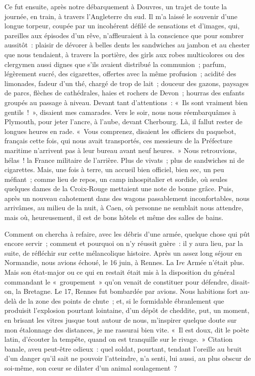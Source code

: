 \documentclass[french,twoside]{book} %
\begin{document}
Ce fut ensuite, après notre débarquement à Douvres, un trajet de toute la journée, en train, à travers l’Angleterre du sud. Il m’a laissé le souvenir d’une longue torpeur, coupée par un incohérent défilé de sensations et d’images, qui, pareilles aux épisodes d’un rêve, n’affleuraient à la conscience que pour sombrer aussitôt : plaisir de dévorer à belles dents les sandwiches au jambon et au chester que nous tendaient, à travers la portière, des girls aux robes multicolores ou des clergymen aussi dignes que s’ils avaient distribué la communion ; parfum, légèrement sucré, des cigarettes, offertes avec la même profusion ; acidité des limonades, fadeur d’un thé, chargé de trop de lait ; douceur des gazons, paysages de   parcs, flèches de cathédrales, haies et rochers de Devon ; hourras des enfants groupés au passage à niveau. Devant tant d’attentions : « Ils sont vraiment bien gentils ! », disaient mes camarades. Vers le soir, nous nous réembarquâmes à Plymouth, pour jeter l’ancre, à l’aube, devant Cherbourg. Là, il fallut rester de longues heures en rade. « Vous comprenez, disaient les officiers du paquebot, français cette fois, qui nous avait transportés, ces messieurs de la Préfecture maritime n’arrivent pas à leur bureau avant neuf heures. » Nous retrouvions, hélas ! la France militaire de l’arrière. Plus de vivats ; plus de sandwiches ni de cigarettes. Mais, une fois à terre, un accueil bien officiel, bien sec, un peu méfiant ; comme lieu de repos, un camp inhospitalier et sordide, où seules quelques dames de la Croix-Rouge mettaient une note de bonne grâce. Puis, après un nouveau cahotement dans des wagons passablement inconfortables, nous arrivâmes, au milieu de la nuit, à Caen, où personne ne semblait nous attendre, mais où, heureusement, il est de bons hôtels et même des salles de bains.\par
Comment on chercha à refaire, avec les débris d’une armée, quelque chose qui pût encore servir ; comment et pourquoi on n’y réussit guère : il y aura lieu, par la suite, de réfléchir sur cette mélancolique histoire. Après un assez long séjour en Normandie, nous avions échoué, le 16 juin, à Rennes. La I\emph{re} Armée n’était plus. Mais son état-major ou ce qui en restait était mis à la disposition du général commandant le « groupement » qu’on venait de constituer pour défendre, disait-on, la Bretagne. Le 17, Rennes fut bombardée par avions. Nous habitions fort au-delà de la zone des points de chute ; et, si le formidable ébranlement que produisit l’explosion pourtant lointaine, d’un dépôt de cheddite, put, un moment, en brisant les vitres jusque tout autour de nous, m’inspirer quelque doute sur mon étalonnage des distances, je me rassurai bien vite. « Il est doux,   dit le poète latin, d’écouter la tempête, quand on est tranquille sur le rivage. » Citation banale, aveu peut-être odieux : quel soldat, pourtant, tendant l’oreille au bruit d’un danger qu’il sait ne pouvoir l’atteindre, n’a senti, lui aussi, au plus obscur de soi-même, son cœur se dilater d’un animal soulagement ?\par
\end{document}

